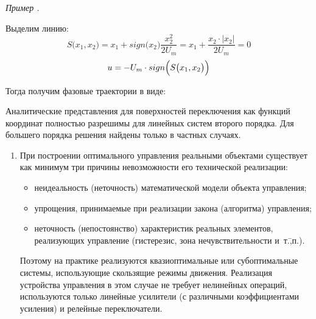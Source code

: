 \documentclass[preprint,russian,a5paper,10pt,twoside,mediummath]{ncc}
\newcounter{problem}[section]				%
\renewcommand{\theproblem}{\thesection.\arabic{problem}}		%
\newenvironment{problem}[1][]%
	{\par \refstepcounter{problem} \begin{flushright} \textit{Пример \theproblem} \end{flushright} \vspace{-\baselineskip} #1 \begin{oframed}}%
	{\par \end{oframed}}%
\begin{document}
\begin{problem}
Выделим линию:
\[ S \bigl( x_1, x_2 \bigr) = x_1 + sign \bigl( x_2 \bigr) \frac{x_2^2}{2U_m} = x_1 + \frac{x_2 \cdot \bigl| x_2 \bigr| }{2U_m} = 0 \]
\[ u = -U_m \cdot sign \Bigl( S \bigl( x_1, x_2 \bigr) \Bigr) \]

\pagebreak
Тогда получим фазовые траектории в виде:
\begin{center}
\end{center}
\end{problem}

Аналитические представления для поверхностей переключения как функций координат полностью разрешимы для линейных систем второго порядка. Для большего порядка решения найдены только в частных случаях.

 \begin{enumerate}[resume]
 \item При построении оптимального управления реальными объектами существует как минимум три причины невозможности его технической реализации:
 \begin{itemize}
 \item неидеальность (неточность) математической модели объекта управления;
 \item упрощения, принимаемые при реализации закона (алгоритма) управления;
 \item неточность (непостоянство) характеристик реальных элементов, реализующих управление (гистерезис, зона нечувствительности и~т.\=,п.).
  \end{itemize}

Поэтому на практике реализуются квазиоптимальные или субоптимальные системы, использующие скользящие режимы движения. Реализация устройства управления в этом случае не требует нелинейных операций, используются только линейные усилители (с различными коэффициентами усиления) и релейные переключатели.
 \end{enumerate}
 
\end{document}
